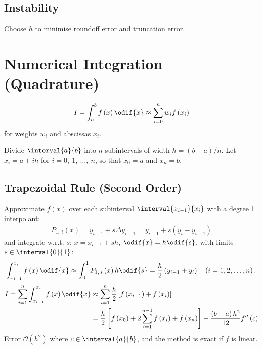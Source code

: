 \documentclass{article}
\begin{document}
\begin{minipage}[t]{62.39259259mm}
    \subsection{Instability}
    Choose \(h\) to minimise roundoff error and truncation error.
    \section{Numerical Integration (Quadrature)}
    \begin{equation*}
        I = \int_a^b f\left( x \right) \odif{x} \approx \sum_{i = 0}^n w_i f\left( x_i \right)
    \end{equation*}
    for weights \(w_i\) and abscissas \(x_i\).
\end{minipage}\hfill%
\begin{minipage}[t]{126.1962963mm}
    Divide \(\interval{a}{b}\) into \(n\) subintervals of width \(h = \left( b - a \right) / n\).
    Let \(x_i = a + i h\) for \(i = 0,\: 1,\: \ldots,\: n\), so that \(x_0 = a\) and \(x_n = b\).
    \subsection{Trapezoidal Rule (Second Order)}
    Approximate \(f\left( x \right)\) over each subinterval \(\interval{x_{i - 1}}{x_i}\) with a degree 1 interpolant:
    \begin{align*}
        P_{1,\: i}\left( x \right) = y_{i - 1} + s \Delta{y_{i - 1}} = y_{i - 1} + s \left( y_i - y_{i - 1} \right)
    \end{align*}
    and integrate w.r.t. \(s\): \(x = x_{i - 1} + s h\), \(\odif{x} = h \odif{s}\), with limits \(s \in \interval{0}{1}\):
    \begin{align*}
        \int_{x_{i - 1}}^{x_i} f\left( x \right) \odif{x} \approx \int_0^1 P_{1,\: i}\left( x \right) h \odif{s} = \frac{h}{2} \left( y_{i - 1} + y_i \right) \quad \left(i = 1, 2, \ldots, n\right).
    \end{align*}
    \begin{align*}
        I = \sum_{i = 1}^n \int_{x_{i-1}}^{x_i} f\left( x \right) \odif{x} & \approx \sum_{i = 1}^n \frac{h}{2} \left[ f\left( x_{i - 1} \right) + f\left( x_i \right) \right]                                                                           \\
                                                                           & = \frac{h}{2} \left[ f\left( x_0 \right) + 2 \sum_{i = 1}^{n - 1} f\left( x_i \right) + f\left( x_n \right) \right] -\frac{\left( b - a \right)h^2}{12} f''\left( c \right)
    \end{align*}
    Error \(\mathcal{O}\left( h^2 \right)\) where \(c \in \interval{a}{b}\), and the method is exact if \(f\) is linear.

\end{minipage}
\end{document}
